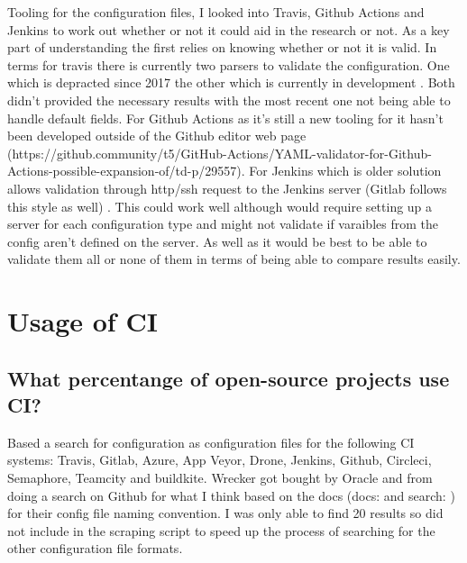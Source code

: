 \documentclass[twoside,12pt,titlepage,a4paper]{article}
\begin{document}
Tooling for the configuration files, I looked into Travis, Github Actions and Jenkins to work out whether or not it could aid in the research or not. As a key part of understanding the first relies on knowing whether or not it is valid. 
In terms for travis there is currently two parsers to validate the configuration. One which is depracted since 2017 \cite{TravisYamlParserOld2017} the other which is currently in development \cite{TravisYamlParserNew2020}. Both didn't provided the necessary results with the most recent one not being able to handle default fields.
For Github Actions as it's still a new tooling for it hasn't been developed outside of the Github editor web page (https://github.community/t5/GitHub-Actions/YAML-validator-for-Github-Actions-possible-expansion-of/td-p/29557).
For Jenkins which is older solution allows validation through http/ssh request to the Jenkins server (Gitlab follows this style as well) \cite{JenkkinsDocs2020} \cite{GitlabDocs2020}. This could work well although would require setting up a server for each configuration type and might not validate if varaibles from the config aren't defined on the server. As well as it would be best to be able to validate them all or none of them in terms of being able to compare results easily.

\section{Usage of CI}

\vspace*{-0.05in}
\subsection{What percentange of open-source projects use CI?}
\vspace*{-0.05in}

Based a search for configuration as configuration files for the following CI systems: Travis, Gitlab, Azure, App Veyor, Drone, Jenkins, Github, Circleci, Semaphore, Teamcity and buildkite. 
Wrecker got bought by Oracle and from doing a search on Github for what I think based on the docs (docs: \cite{WreckerDocs} and search: \cite{WreckerOpenSourceGithubSearch}) for their config file naming convention. I was only able to find 20 results so did not include in the scraping script to speed up the process of searching for the other configuration file formats.


\end{document}

